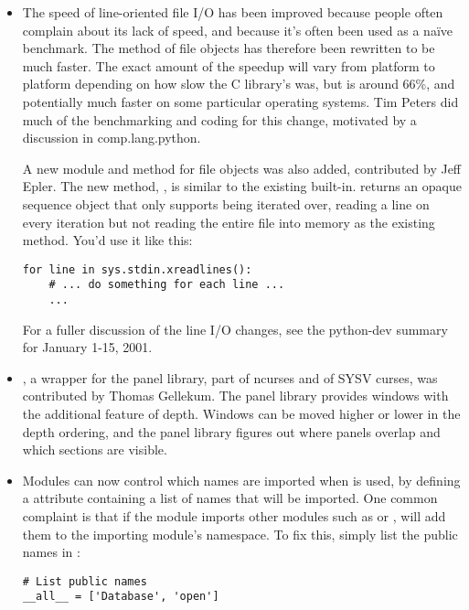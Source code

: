 \documentclass{howto}
\begin{document}
\begin{itemize}


\item The speed of line-oriented file I/O has been improved because
people often complain about its lack of speed, and because it's often
been used as a na\"ive benchmark.  The  method of
file objects has therefore been rewritten to be much faster.  The
exact amount of the speedup will vary from platform to platform
depending on how slow the C library's  was, but is
around 66\%, and potentially much faster on some particular operating
systems.  Tim Peters did much of the benchmarking and coding for this
change, motivated by a discussion in comp.lang.python.

A new module and method for file objects was also added, contributed
by Jeff Epler. The new method, , is similar to
the existing  built-in.  
returns an opaque sequence object that only supports being iterated
over, reading a line on every iteration but not reading the entire
file into memory as the existing  method.  You'd
use it like this:

\begin{verbatim}
for line in sys.stdin.xreadlines():
    # ... do something for each line ...
    ...
\end{verbatim}

For a fuller discussion of the line I/O changes, see the python-dev
summary for January 1-15, 2001.  
 
\item {}, a wrapper for the panel library, part of
ncurses and of SYSV curses, was contributed by Thomas Gellekum.  The
panel library provides windows with the additional feature of depth.
Windows can be moved higher or lower in the depth ordering, and the
panel library figures out where panels overlap and which sections are
visible.

\item Modules can now control which names are imported when  is used, by defining a  attribute
containing a list of names that will be imported.  One common
complaint is that if the module imports other modules such as
 or , 
will add them to the importing module's namespace.  To fix this,
simply list the public names in :

\begin{verbatim}
# List public names
__all__ = ['Database', 'open']
\end{verbatim}


\end{itemize}
\end{document}
